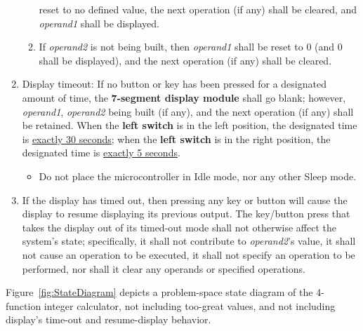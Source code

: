 \begin{enumerate}
\begin{enumerate}
        reset to no defined value, the next operation (if any) shall be
        cleared, and \textit{operand1} shall be displayed.
    \item If \textit{operand2} is not being built, then \textit{operand1} shall
        be reset to 0 (and 0 shall be displayed), and the next operation (if
        any) shall be cleared.
    \end{enumerate}
\item Display timeout: If no button or key has been pressed for a designated
    amount of time, the \textbf{7-segment display module} shall go blank;
    however, \textit{operand1}, \textit{operand2} being built (if any), and the
    next operation (if any) shall be retained. When the \textbf{left switch} is
    in the left position, the designated time is \underline{exactly 30
    seconds}; when the \textbf{left switch} is in the right position, the
    designated time is \underline{exactly 5 seconds}.
    \begin{itemize}
    \item Do not place the microcontroller in Idle mode, nor any other Sleep
        mode.
    \end{itemize}
\item \label{spec:Wakening} If the display has timed out, then pressing any key
    or button will cause the display to resume displaying its previous output.
    The key/button press that takes the display out of its timed-out mode shall
    not otherwise affect the system's state; specifically, it shall not
    contribute to \textit{operand2}'s value, it shall not cause an operation to
    be executed, it shall not specify an operation to be performed, nor shall
    it clear any operands or specified operations.
\end{enumerate}

Figure~\ref{fig:StateDiagram} depicts a problem-space state diagram of the
4-function integer calculator, not including too-great values, and not
including display's time-out and resume-display behavior.

